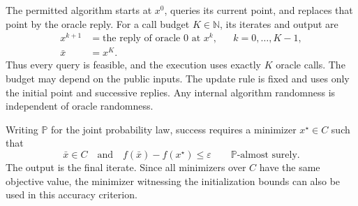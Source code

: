 \documentclass[10pt]{article}
\theoremstyle{definition}
\begin{document}
The permitted algorithm starts at $x^0$, queries its current point, and replaces that point by the oracle reply. For a call budget $K\in\mathbb{N}$, its iterates and output are
\begin{align*}
x^{k+1} &= \text{the reply of oracle }0\text{ at }x^k,
&&k=0,\ldots,K-1,\\
\bar{x} &= x^K.
\end{align*}
Thus every query is feasible, and the execution uses exactly $K$ oracle calls. The budget may depend on the public inputs. The update rule is fixed and uses only the initial point and successive replies. Any internal algorithm randomness is independent of oracle randomness.

Writing $\mathbb{P}$ for the joint probability law, success requires a minimizer $x^\star\in C$ such that
\[
\bar{x}\in C
\quad\text{and}\quad
f(\bar{x})-f(x^\star)\leq\varepsilon
\qquad \mathbb{P}\text{-almost surely}.
\]
The output is the final iterate. Since all minimizers over $C$ have the same objective value, the minimizer witnessing the initialization bounds can also be used in this accuracy criterion.
\end{document}
